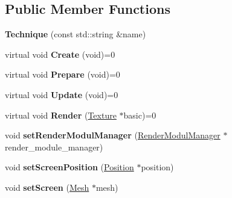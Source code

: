 \subsection*{Public Member Functions}
\begin{DoxyCompactItemize}
\item 
\hypertarget{classEngine_1_1Technique_a20fd05c572fd43916b29444ee25dec3a}{}{\bfseries Technique} (const std\+::string \&name)\label{classEngine_1_1Technique_a20fd05c572fd43916b29444ee25dec3a}

\item 
\hypertarget{classEngine_1_1Technique_ab8e9a9bfb27736109af5d47d52194815}{}virtual void {\bfseries Create} (void)=0\label{classEngine_1_1Technique_ab8e9a9bfb27736109af5d47d52194815}

\item 
\hypertarget{classEngine_1_1Technique_a2c54d34073fc450fcf181558fca8c368}{}virtual void {\bfseries Prepare} (void)=0\label{classEngine_1_1Technique_a2c54d34073fc450fcf181558fca8c368}

\item 
\hypertarget{classEngine_1_1Technique_a1c141e8cbfe8598f20b38737bfe04b9e}{}virtual void {\bfseries Update} (void)=0\label{classEngine_1_1Technique_a1c141e8cbfe8598f20b38737bfe04b9e}

\item 
\hypertarget{classEngine_1_1Technique_a8a86b9995a456223764657f391170441}{}virtual void {\bfseries Render} (\hyperlink{classEngine_1_1Texture}{Texture} $\ast$basic)=0\label{classEngine_1_1Technique_a8a86b9995a456223764657f391170441}

\item 
\hypertarget{classEngine_1_1Technique_ac8b3e18c697ca7f61a4af85c54ea8b9c}{}void {\bfseries set\+Render\+Modul\+Manager} (\hyperlink{classEngine_1_1RenderModulManager}{Render\+Modul\+Manager} $\ast$render\+\_\+module\+\_\+manager)\label{classEngine_1_1Technique_ac8b3e18c697ca7f61a4af85c54ea8b9c}

\item 
\hypertarget{classEngine_1_1Technique_a8111fabffbbcc520463ad58e4fd299fd}{}void {\bfseries set\+Screen\+Position} (\hyperlink{classEngine_1_1Position}{Position} $\ast$position)\label{classEngine_1_1Technique_a8111fabffbbcc520463ad58e4fd299fd}

\item 
\hypertarget{classEngine_1_1Technique_a18b88a7031b81b1db2df3f39d798c7a0}{}void {\bfseries set\+Screen} (\hyperlink{classEngine_1_1Mesh}{Mesh} $\ast$mesh)\label{classEngine_1_1Technique_a18b88a7031b81b1db2df3f39d798c7a0}


\end{DoxyCompactItemize}
